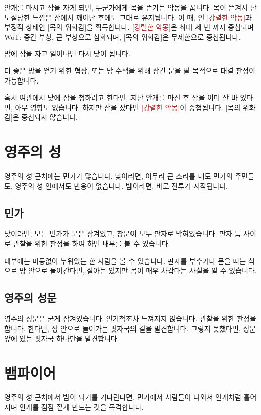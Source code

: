 \documentclass{report}
\begin{document}
	안개를 마시고 잠을 자게 되면, 누군가에게 목을 뜯기는 악몽을 꿉니다. 목이 뜯겨서 난도질당한 느낌은 잠에서 깨어난 후에도 그대로 유지됩니다. 이 때, 인 \textcolor{Brown}{[강렬한 악몽]}과 부정적 상태인 \textcolor{RubineRed}{[목의 위화감]}을 획득합니다. \textcolor{Brown}{[강렬한 악몽]}은 최대 세 번 까지 중첩되며 \textcolor{\wotcolor}{WoT: 중간 부상, 큰 부상으로 심화되며}, \textcolor{RubineRed}{[목의 위화감]}은 무제한으로 중첩됩니다.
	
	밤에 잠을 자고 일어나면 다시 낮이 됩니다.
	
	더 좋은 방을 얻기 위한 협상, 또는 밤 수색을 위해 잠긴 문을 딸 목적으로 대결 판정이 가능합니다.
	
	혹시 여관에서 낮에 잠을 청하려고 한다면, 지난 안개를 마신 후 잠을 이미 잔 바 있다면, 아무 영향도 없습니다. 하지만 잠을 잤다면 \textcolor{Brown}{[강렬한 악몽]}이 중첩됩니다. \textcolor{RubineRed}{[목의 위화감]}은 중첩되지 않습니다.
	
	\section{영주의 성}
	영주의 성 근처에는 민가가 많습니다. 낮이라면, 아무리 큰 소리를 내도 민가의 주민들도, 영주의 성 안에서도 반응이 없습니다. 밤이라면, 바로 전투가 시작됩니다.
	
	\subsection{민가}
	낮이라면, 모든 민가가 문은 잠겨있고, 창문이 모두 판자로 막혀있습니다. 판자 틈 사이로 관찰을 위한 판정을 하여 하면 내부를 볼 수 있습니다.
	
	내부에는 미동없이 누워있는 한 사람을 볼 수 있습니다. 판자를 부수거나 문을 따는 식으로 방 안으로 들어간다면, 살아는 있지만 몸이 매우 차갑다는 사실을 알 수 있습니다.
	
	\subsection{영주의 성문}
	영주의 성문은 굳게 잠겨있습니다. 인기척조차 느껴지지 않습니다. 관찰을 위한 판정을 합니다. 한다면, 성 안으로 들어가는 핏자국의 길을 발견합니다. 그렇지 못했다면, 성문 앞에 있는 핏자국 하나만을 발견합니다.
	
	\section{뱀파이어}
	영주의 성 근처에서 밤이 되기를 기다린다면, 민가에서 사람들이 나와서 안개처럼 흩어지며 안개를 점점 짙게 만드는 것을 목격합니다.
	
\end{document}
